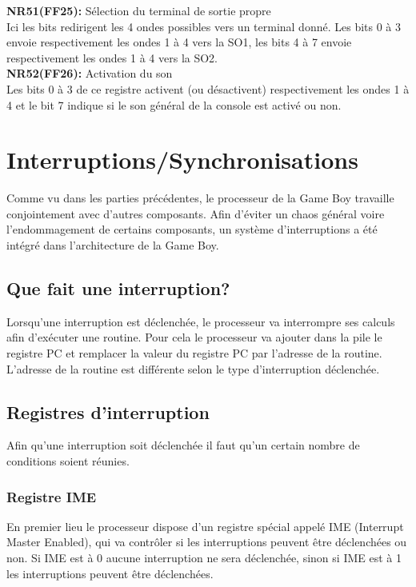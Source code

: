 \documentclass[french]{report}
\begin{document}
	\textbf{NR51(FF25):} Sélection du terminal de sortie propre \\
		Ici les bits redirigent les 4 ondes possibles vers un
		terminal donné.
		Les bits 0 à 3 envoie respectivement les ondes 1 à 4
		vers la SO1, les bits 4 à 7 envoie respectivement les
		ondes 1 à 4 vers la SO2.\\

	\textbf{NR52(FF26):} Activation du son \\
		Les bits 0 à 3 de ce registre activent (ou
		désactivent) respectivement les ondes 1 à 4 et le bit
		7 indique si le son général de la console est activé
		ou non.
\section{Interruptions/Synchronisations}
Comme vu dans les parties précédentes, le processeur de la Game Boy travaille conjointement avec d'autres composants. Afin d'éviter un chaos général voire l'endommagement de certains composants, un système d'interruptions a été intégré dans l'architecture de la Game Boy.
\subsection{Que fait une interruption?}
Lorsqu'une interruption est déclenchée, le processeur va interrompre ses calculs afin d'exécuter une routine. Pour cela le processeur va ajouter dans la pile le registre PC et remplacer la valeur du registre PC par l'adresse de la routine. L'adresse de la routine est différente selon le type d'interruption déclenchée.
\subsection{Registres d'interruption}
Afin qu'une interruption soit déclenchée il faut qu'un certain nombre de conditions soient réunies.
\subsubsection{Registre IME}
En premier lieu le processeur dispose d'un registre spécial appelé IME (Interrupt Master Enabled), qui va contrôler si les interruptions peuvent être déclenchées ou non. Si IME est à 0 aucune interruption ne sera déclenchée, sinon si IME est à 1 les interruptions peuvent être déclenchées.
\end{document}
